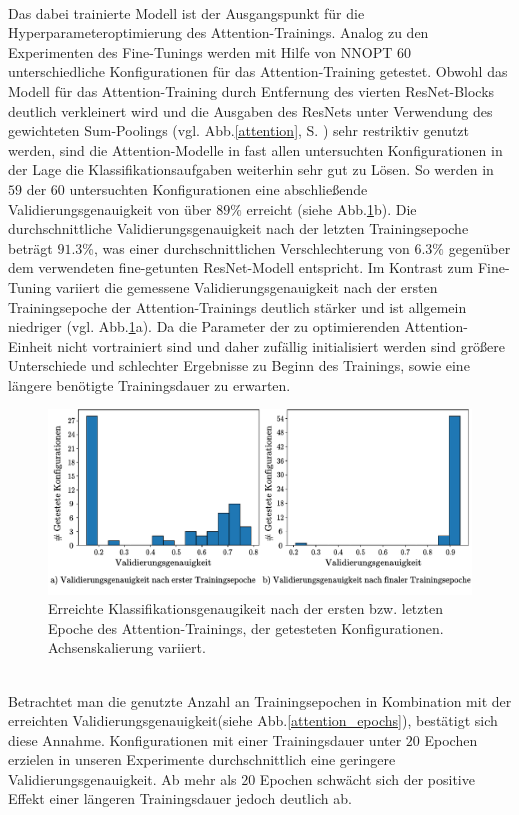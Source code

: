 \\
Das dabei trainierte Modell ist der Ausgangspunkt für die Hyperparameteroptimierung des Attention-Trainings. Analog zu den Experimenten des Fine-Tunings werden mit Hilfe von NNOPT $60$ unterschiedliche Konfigurationen für das Attention-Training getestet. Obwohl das Modell für das Attention-Training durch Entfernung des vierten ResNet-Blocks deutlich verkleinert wird und die Ausgaben des ResNets unter Verwendung des gewichteten Sum-Poolings (vgl. Abb.\ref{attention}, S. \pageref{attention}) sehr restriktiv genutzt werden, sind die Attention-Modelle in fast allen untersuchten Konfigurationen in der Lage die Klassifikationsaufgaben weiterhin sehr gut zu Lösen. So werden in $59$ der $60$ untersuchten Konfigurationen eine abschließende Validierungsgenauigkeit von über $89\%$ erreicht (siehe Abb.\ref{attention_int_end}b). Die durchschnittliche Validierungsgenauigkeit nach der letzten Trainingsepoche beträgt $91.3\%$, was einer durchschnittlichen Verschlechterung von $6.3\%$ gegenüber dem verwendeten fine-getunten ResNet-Modell entspricht. Im Kontrast zum Fine-Tuning variiert die gemessene Validierungsgenauigkeit nach der ersten Trainingsepoche der Attention-Trainings deutlich stärker und ist allgemein niedriger (vgl. Abb.\ref{attention_int_end}a). Da die Parameter der zu optimierenden Attention-Einheit nicht vortrainiert sind und daher zufällig initialisiert werden sind größere Unterschiede und schlechter Ergebnisse zu Beginn des Trainings, sowie eine längere benötigte Trainingsdauer zu erwarten.
\begin{figure}[h]
\includegraphics[scale=0.75]{NNOPT/init_and_end_perf_attention.pdf}
\caption{Erreichte Klassifikationsgenaugikeit nach der ersten bzw. letzten Epoche des Attention-Trainings, der getesteten Konfigurationen. Achsenskalierung variiert.}
\label{attention_int_end}
\end{figure}
\\
Betrachtet man die genutzte Anzahl an Trainingsepochen in Kombination mit der erreichten Validierungsgenauigkeit(siehe Abb.\ref{attention_epochs}), bestätigt sich diese Annahme. Konfigurationen mit einer Trainingsdauer unter $20$ Epochen erzielen in unseren Experimente durchschnittlich eine geringere Validierungsgenauigkeit. Ab mehr als $20$ Epochen schwächt sich der positive Effekt einer längeren Trainingsdauer jedoch deutlich ab.
